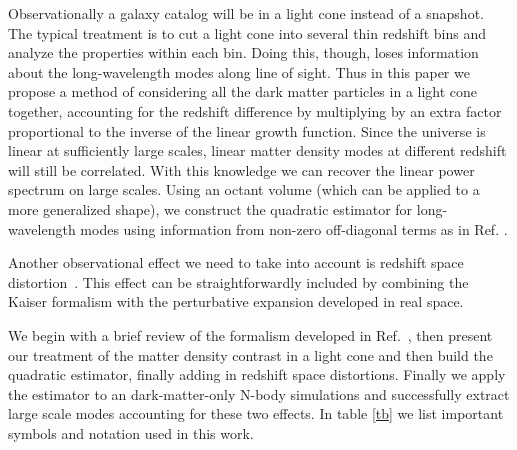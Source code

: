 \documentclass[prd,amsmath,amssymb,floatfix,superscriptaddress,nofootinbib,twocolumn]{revtex4-1}
\begin{document}
Observationally a galaxy catalog will be in a light cone \cite{Carroll:1997gr} instead of a snapshot. The typical  treatment is to cut a light cone into several thin redshift bins \cite{Chuang:2016uuz} and analyze the properties within each bin. Doing this, though, loses information about the long-wavelength modes along line of sight. Thus in this paper we propose a method of considering all the dark matter particles in a light cone together, accounting for the redshift difference by multiplying by an extra factor proportional to the inverse of the linear growth function. Since the universe is linear at sufficiently large scales, linear matter density modes at different redshift will still be correlated. With this knowledge we can recover the linear power spectrum on large scales. Using an octant volume (which can be applied to a more generalized shape), we construct the quadratic estimator for long-wavelength modes using information from non-zero off-diagonal terms as in Ref. \cite{Li:2020fir}.

Another observational effect we need to take into account is redshift space distortion~\cite{Kaiser:1987rsd}. This effect can be straightforwardly included by combining the Kaiser formalism with the perturbative expansion developed in real space.

We begin with a brief review of the formalism developed in Ref.~\cite{Li:2020fir}, then present our treatment of the matter density contrast in a light cone and then build the quadratic estimator, finally adding in redshift space distortions. Finally we apply the estimator to an dark-matter-only N-body simulations and successfully extract large scale modes accounting for these two effects. In table \ref{tb} we list important symbols and notation used in this work.
\clearpage
\end{document}
